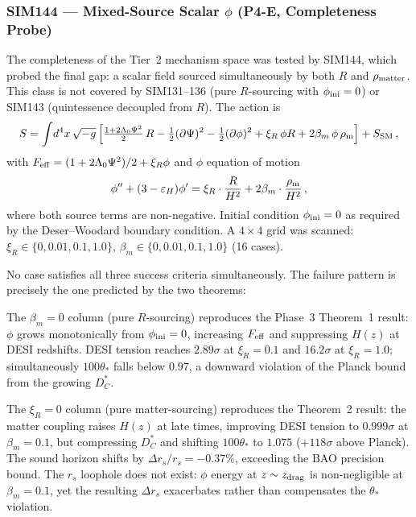 \documentclass[12pt,a4paper]{article}
\newcommand{\Feff}{F_{\rm eff}}
\newcommand{\Lz}{\Lambda_0}
\newcommand{\thetastar}{\theta_*}
\newcommand{\rs}{r_s}
\theoremstyle{plain}
\begin{document}
\subsubsection{SIM144 --- Mixed-Source Scalar $\phi$ (P4-E, Completeness Probe)}
\label{sec:sim144}

The completeness of the Tier~2 mechanism space was tested by SIM144, which probed
the final gap: a scalar field sourced simultaneously by both $R$ and $\rho_{\rm matter}$.
This class is not covered by SIM131--136 (pure $R$-sourcing with $\phi_{\rm ini}=0$)
or SIM143 (quintessence decoupled from $R$). The action is
\begin{equation}
  S = \int\!d^4x\,\sqrt{-g}\,\Bigl[
    \tfrac{1+2\Lz\Psi^2}{2}\,R
    - \tfrac{1}{2}(\partial\Psi)^2
    - \tfrac{1}{2}(\partial\phi)^2
    + \xi_R\,\phi R
    + 2\beta_m\,\phi\,\rho_{\rm m}
  \Bigr] + S_{\rm SM}\,,
  \label{eq:sim144}
\end{equation}
with $\Feff = (1+2\Lz\Psi^2)/2 + \xi_R\phi$ and $\phi$ equation of motion
\begin{equation}
  \phi'' + (3-\varepsilon_H)\phi'
  = \xi_R\cdot\frac{R}{H^2} + 2\beta_m\cdot\frac{\rho_{\rm m}}{H^2}\,,
  \label{eq:sim144-eom}
\end{equation}
where both source terms are non-negative. Initial condition $\phi_{\rm ini}=0$ as required
by the Deser--Woodard boundary condition. A $4\times4$ grid was scanned:
$\xi_R\in\{0,0.01,0.1,1.0\}$, $\beta_m\in\{0,0.01,0.1,1.0\}$ (16 cases).

No case satisfies all three success criteria simultaneously. The failure pattern is
precisely the one predicted by the two theorems:

The $\beta_m=0$ column (pure $R$-sourcing) reproduces the Phase~3 Theorem~1 result:
$\phi$ grows monotonically from $\phi_{\rm ini}=0$, increasing $\Feff$ and suppressing
$H(z)$ at DESI redshifts. DESI tension reaches $2.89\sigma$ at $\xi_R=0.1$ and
$16.2\sigma$ at $\xi_R=1.0$; simultaneously $100\thetastar$ falls below $0.97$,
a downward violation of the Planck bound from the growing $D_C^*$.

The $\xi_R=0$ column (pure matter-sourcing) reproduces the Theorem~2 result: the
matter coupling raises $H(z)$ at late times, improving DESI tension to $0.999\sigma$
at $\beta_m=0.1$, but compressing $D_C^*$ and shifting $100\thetastar$ to $1.075$
($+118\sigma$ above Planck). The sound horizon shifts by $\Delta\rs/\rs=-0.37\%$,
exceeding the BAO precision bound. The $\rs$ loophole does not exist: $\phi$ energy
at $z\sim z_{\rm drag}$ is non-negligible at $\beta_m=0.1$, yet the resulting $\Delta\rs$
exacerbates rather than compensates the $\thetastar$ violation.
\end{document}
